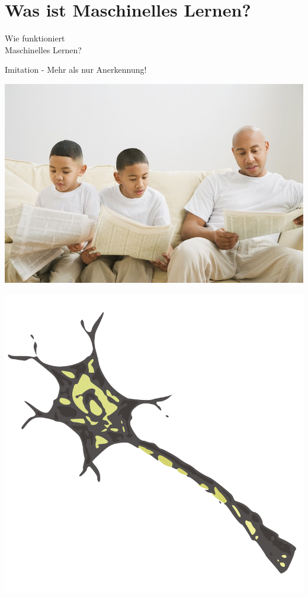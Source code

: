 \documentclass[aspectratio=169,x11names]{beamer}
\begin{document}
\section{Was ist Maschinelles Lernen?}

\begin{frame}
\begin{center}
\huge
Wie funktioniert\\Maschinelles Lernen?
\end{center}
\end{frame}

\begin{frame}
\begin{center}
\Large Imitation - Mehr als nur Anerkennung!
\medskip\medskip

\includegraphics[scale=0.35]{images/imitation}
\end{center}
\end{frame}

\begin{frame}
\begin{center}
\includegraphics[height=0.8\textheight,keepaspectratio]{images/neuron} 
\end{center}
\end{frame}
\end{document}
